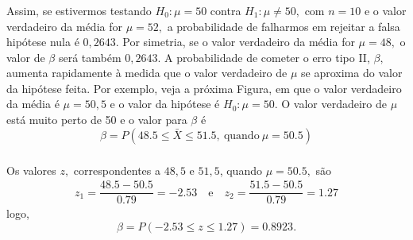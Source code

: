 \documentclass[14pt,aspectratio=1610]{beamer}
\newcommand{\Ho}{\ensuremath{H_{0}}}
\newcommand{\Hi}{\ensuremath{H_{1}}}
\begin{document}
\begin{frame}{}
\frametitle{}
\begin{block}{}
\justifying
Assim, se estivermos testando $\Ho: \mu = 50$ contra $\Hi: \mu \neq 50,$ com $n = 10$ e o valor verdadeiro da média for $\mu = 52,$ a probabilidade de falharmos em 
rejeitar a falsa hipótese nula é $0,2643.$ Por simetria, se o valor verdadeiro da média for $\mu = 48,$ o valor de $\beta$ será também $0,2643.$ A probabilidade de 
cometer o erro tipo II, $\beta,$ aumenta rapidamente à medida que o valor verdadeiro de $\mu$ se aproxima do valor da hipótese feita. Por exemplo, veja a próxima 
Figura, em que o valor verdadeiro da média é $\mu = 50,5$ e o valor da hipótese é $\Ho: \mu = 50.$ O valor verdadeiro de $\mu$ está muito perto de 50 e o valor para 
$\beta$ é $$\beta=P(48.5\leq\bar{X}\leq 51.5,\ \textrm{quando}\ \mu=50.5)$$
\end{block}
\end{frame}

\begin{frame}{}
\frametitle{}
\begin{block}{}
\justifying
Os valores $z,$ correspondentes a $48,5$ e $51,5$, quando $\mu = 50.5,$ são
\begin{align*}
z_{1}=\dfrac{48.5-50.5}{0.79}=-2.53\quad \textrm{e}\quad z_{2}=\dfrac{51.5-50.5}{0.79}=1.27
\end{align*}
logo, $$\beta=P(-2.53\leq z\leq 1.27)=0.8923.$$
\end{block}
\end{frame}

\begin{frame}{}
\begin{center}
\end{center}
\end{frame}
\end{document}
